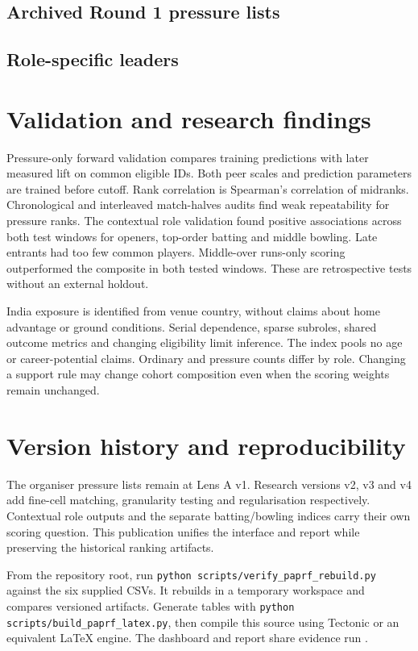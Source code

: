 \documentclass[12pt,a4paper]{article}
\begin{document}
\subsection{Archived Round 1 pressure lists}
\PressureTable
\subsection{Role-specific leaders}
\RoleTable

\section{Validation and research findings}
Pressure-only forward validation compares training predictions with later measured lift on common eligible IDs. Both peer scales and prediction parameters are trained before cutoff. Rank correlation is Spearman's correlation of midranks. Chronological and interleaved match-halves audits find weak repeatability for pressure ranks. The contextual role validation found positive associations across both test windows for openers, top-order batting and middle bowling. Late entrants had too few common players. Middle-over runs-only scoring outperformed the composite in both tested windows. These are retrospective tests without an external holdout.

India exposure is identified from venue country, without claims about home advantage or ground conditions. Serial dependence, sparse subroles, shared outcome metrics and changing eligibility limit inference. The index pools no age or career-potential claims. Ordinary and pressure counts differ by role. Changing a support rule may change cohort composition even when the scoring weights remain unchanged.

\section{Version history and reproducibility}
The organiser pressure lists remain at Lens A v1. Research versions v2, v3 and v4 add fine-cell matching, granularity testing and regularisation respectively. Contextual role outputs and the separate batting/bowling indices carry their own scoring question. This publication unifies the interface and report while preserving the historical ranking artifacts.

From the repository root, run \texttt{python scripts/verify\_paprf\_rebuild.py} against the six supplied CSVs. It rebuilds in a temporary workspace and compares versioned artifacts. Generate tables with \texttt{python scripts/build\_paprf\_latex.py}, then compile this source using Tectonic or an equivalent LaTeX engine. The dashboard and report share evidence run \texttt{\RunID}.
\end{document}
